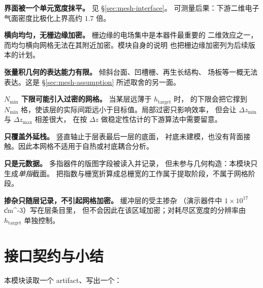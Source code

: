 \begin{bounds}
  \item \textbf{界面被一个单元宽度抹平。} 见 \S\ref{sec:mesh-interface}。
        可测量后果：下游二维电子气面密度比极化上界高约 $1.7$ 倍。

  \item \textbf{横向均匀，无栅边缘加密。} 栅边缘的电场集中是本器件最重要的
        二维效应之一，而均匀横向网格无法在其附近加密。模块自身的说明
        也把栅边缘加密列为后续版本的计划。

  \item \textbf{张量积几何的表达能力有限。} 倾斜台面、凹槽栅、再生长结构、
        场板等一概无法表达。这是 \S\ref{sec:mesh-assumption} 所述取舍的另一面。

  \item \textbf{$N_{\min}$ 下限可能引入过密的网格。} 当某层远薄于
        $h_{\text{target}}$ 时， 的下限会把它撑到
        $N_{\min}$ 格，使该层的实际间距远小于目标值。局部过密只影响效率，
        但会让 $\Delta z_{\min}$ 与 $\Delta z_{\max}$ 相差很大，
        在按 $\Delta z$ 做稳定性估计的下游算法中需要留意。

  \item \textbf{只覆盖外延栈。} 竖直轴止于层表最后一层的底面，
        衬底未建模，也没有背面接触。因此本网格不适用于自热或衬底耦合分析。

  \item \textbf{ 只是元数据。} 多指器件的版图字段被读入并记录，
        但未参与几何构造：本模块只生成\emph{单指}截面。
        把指数与栅宽折算成总栅宽的工作属于提取阶段，不属于网格阶段。

  \item \textbf{掺杂只随层记录，不引起网格加密。} 缓冲层的受主掺杂
        （演示器件中 $1\times10^{17}$\U{cm^{-3}}）写在层条目里，
        但不会因此在该区域加密；对耗尽区宽度的分辨率由
        $h_{\text{target}}$ 单独控制。
\end{bounds}

\section{接口契约与小结}
\label{sec:mesh-interface-contract}

本模块读取一个 artifact、写出一个：

